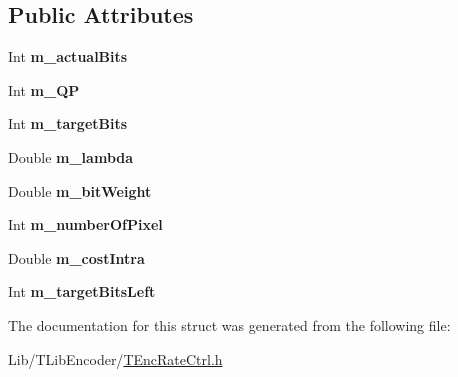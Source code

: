 \subsection*{Public Attributes}
\begin{DoxyCompactItemize}
\item 
\mbox{\label{struct_t_r_c_l_c_u_a03857d3683ef4cea3580b9ef31ff4a55}} 
Int {\bfseries m\+\_\+actual\+Bits}
\item 
\mbox{\label{struct_t_r_c_l_c_u_a3d11e5d73c32366220115669bc6c0b96}} 
Int {\bfseries m\+\_\+\+QP}
\item 
\mbox{\label{struct_t_r_c_l_c_u_ad9a5c9cf6dbdc22090b0c6a5801389fa}} 
Int {\bfseries m\+\_\+target\+Bits}
\item 
\mbox{\label{struct_t_r_c_l_c_u_add6542ff5e8589d8771bc62ed34411f6}} 
Double {\bfseries m\+\_\+lambda}
\item 
\mbox{\label{struct_t_r_c_l_c_u_a4d647c692d83f15799d68761a9f5c606}} 
Double {\bfseries m\+\_\+bit\+Weight}
\item 
\mbox{\label{struct_t_r_c_l_c_u_a54e545902dc2e6518cf42e38d42318ad}} 
Int {\bfseries m\+\_\+number\+Of\+Pixel}
\item 
\mbox{\label{struct_t_r_c_l_c_u_ab587f185c770694d24aff0c97986366b}} 
Double {\bfseries m\+\_\+cost\+Intra}
\item 
\mbox{\label{struct_t_r_c_l_c_u_ab6d636fbacc10b7daf3144b2e9233839}} 
Int {\bfseries m\+\_\+target\+Bits\+Left}
\end{DoxyCompactItemize}


The documentation for this struct was generated from the following file\+:\begin{DoxyCompactItemize}
\item 
Lib/\+T\+Lib\+Encoder/\hyperlink{_t_enc_rate_ctrl_8h}{T\+Enc\+Rate\+Ctrl.\+h}\end{DoxyCompactItemize}
